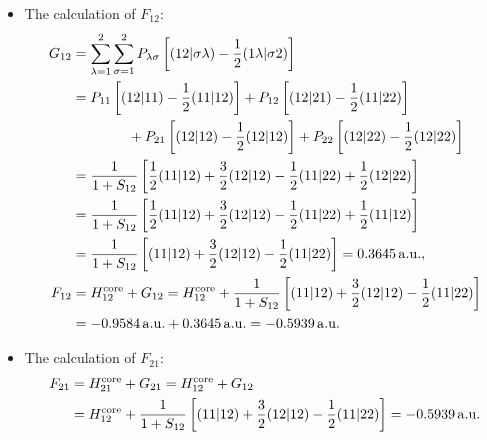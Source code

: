 \documentclass[a4paper]{book}
\newcounter{solution}[chapter]
\newcommand{\core}{{\rm core}}
\newcommand{\au}{{\rm a.u.}}
\begin{document}
\begin{solution}
\begin{itemize}
	\item The calculation of $F_{12}$:
		\begin{align*}
		G_{12} &= \sum_{ \lambda=1 }^2 \sum_{ \sigma=1 }^2 P_{ \lambda \sigma } \left[ ( 12 | \sigma \lambda ) - \frac{1}{2} ( 1 \lambda | \sigma 2 ) \right] \\
		&= P_{11} \left[ ( 12 | 11 ) - \frac{1}{2} ( 11 | 12 ) \right] + P_{12} \left[ ( 12 | 21 ) - \frac{1}{2} ( 11 | 22 ) \right] \\
		&\hspace{4em} + P_{21} \left[ ( 12 | 12 ) - \frac{1}{2} ( 12 | 12 ) \right] + P_{22} \left[ ( 12 | 22 ) - \frac{1}{2} ( 12 | 22 ) \right] \\
		&= \frac{1}{ 1 + S_{12} } \left[ \frac{1}{2} ( 11 | 12 ) + \frac{3}{2}( 12 | 12 ) - \frac{1}{2}( 11 | 22 ) + \frac{1}{2} ( 12 | 22 ) \right] \\
		&= \frac{1}{ 1 + S_{12} } \left[ \frac{1}{2} ( 11 | 12 ) + \frac{3}{2}( 12 | 12 ) - \frac{1}{2}( 11 | 22 ) + \frac{1}{2} ( 11 | 12 ) \right] \\
		&= \frac{1}{ 1 + S_{12} } \left[ ( 11 | 12 ) + \frac{3}{2}( 12 | 12 ) - \frac{1}{2}( 11 | 22 ) \right] = 0.3645 \, \au , \\
		F_{12} &= H^\core_{12} + G_{12} = H^\core_{12} + \frac{1}{ 1 + S_{12} } \left[ ( 11 | 12 ) + \frac{3}{2}( 12 | 12 ) - \frac{1}{2}( 11 | 22 ) \right] \\
		&= -0.9584 \, \au + 0.3645 \, \au = -0.5939 \, \au 
	\end{align*}
	
	\item The calculation of $F_{21}$:
	\begin{align*}
		F_{21} &= H^\core_{21} + G_{21} = H^\core_{12} + G_{12} \\
		&= H^\core_{12} + \frac{1}{ 1 + S_{12} } \left[ ( 11 | 12 ) + \frac{3}{2}( 12 | 12 ) - \frac{1}{2}( 11 | 22 ) \right] = -0.5939 \, \au 
	\end{align*}
	

\end{itemize}
\end{solution}
\end{document}
